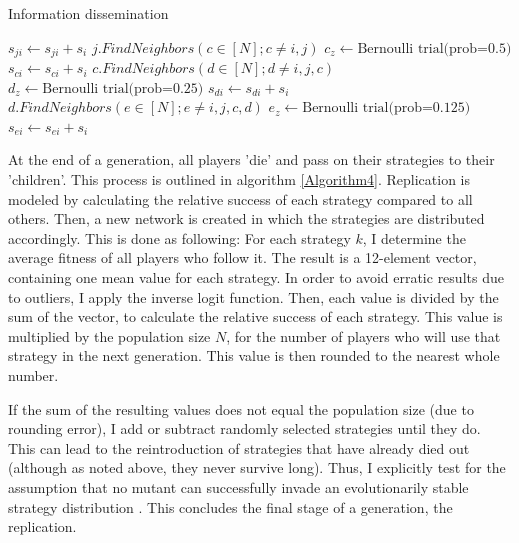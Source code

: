 \documentclass{JASSS}
\begin{document}
\begin{algorithm}
	\caption{Information dissemination}
	\label{Algorithm3}
	\begin{algorithmic}[1]
		\State $s_{ji} \gets s_{ji}+s_{i}$
		\State $j.FindNeighbors(c\in[N];c\neq i,j)$
		\State $c_z \gets \text{Bernoulli trial(prob=0.5)}$
		\State $s_{ci} \gets s_{ci}+s_{i}$
		\State $c.FindNeighbors(d\in[N];d\neq i,j,c)$
		\State $d_z \gets \text{Bernoulli trial(prob=0.25)}$
		\State $s_{di} \gets s_{di}+s_{i}$
		\State $d.FindNeighbors(e\in[N];e\neq i,j,c,d)$
		\State $e_z \gets \text{Bernoulli trial(prob=0.125)}$
		\State $s_{ei} \gets s_{ei}+s_{i}$
		\EndIf
		\EndFor
		\EndIf
		\EndFor
		\EndIf
		\EndFor
		\EndFor
		\EndFunction
	\end{algorithmic}
\end{algorithm}

At the end of a generation, all players 'die' and pass on their strategies to their 'children'. This process is outlined in algorithm \ref{Algorithm4}. Replication is modeled by calculating the relative success of each strategy compared to all others. Then, a new network is created in which the strategies are distributed accordingly. This is done as following: For each strategy $k$, I determine the average fitness of all players who follow it. The result is a 12-element vector, containing one mean value for each strategy. In order to avoid erratic results due to outliers, I apply the inverse logit function. Then, each value is divided by the sum of the vector, to calculate the relative success of each strategy. This value is multiplied by the population size $N$, for the number of players who will use that strategy in the next generation. This value is then rounded to the nearest whole number.

If the sum of the resulting values does not equal the population size (due to rounding error), I add or subtract randomly selected strategies until they do. This can lead to the reintroduction of strategies that have already died out (although as noted above, they never survive long). Thus, I explicitly test for the assumption that no mutant can successfully invade an evolutionarily stable strategy distribution \citep{hamilton1964_2}. This concludes the final stage of a generation, the replication.
\end{document}
